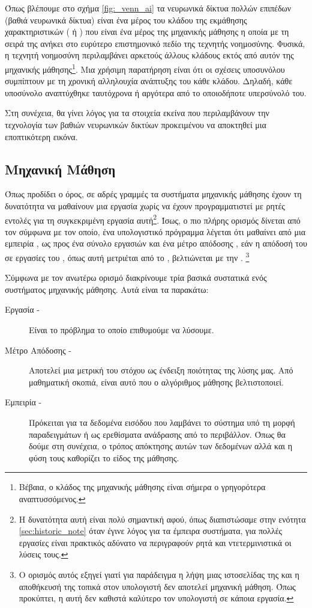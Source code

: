 Όπως βλέπουμε στο σχήμα \ref{fig:_venn_ai} τα νευρωνικά δίκτυα πολλών επιπέδων (βαθιά νευρωνικά δίκτυα) είναι ένα μέρος του κλάδου της εκμάθησης χαρακτηριστικών ( ή ) που είναι ένα μέρος της μηχανικής μάθησης η οποία με τη σειρά της ανήκει στο ευρύτερο επιστημονικό πεδίο της τεχνητής νοημοσύνης. Φυσικά, η τεχνητή νοημοσύνη περιλαμβάνει αρκετούς άλλους κλάδους εκτός από αυτόν της μηχανικής μάθησης\footnote{Βέβαια, ο κλάδος της μηχανικής μάθησης είναι σήμερα ο γρηγορότερα αναπτυσσόμενος.}. Μια χρήσιμη παρατήρηση είναι ότι οι σχέσεις υποσυνόλου συμπίπτουν με τη χρονική αλληλουχία ανάπτυξης του κάθε κλάδου. Δηλαδή, κάθε υποσύνολο αναπτύχθηκε ταυτόχρονα ή αργότερα από το οποιοδήποτε υπερσύνολό του.
\par
Στη συνέχεια, θα γίνει λόγος για τα στοιχεία εκείνα που περιλαμβάνουν την τεχνολογία των βαθιών νευρωνικών δικτύων προκειμένου να αποκτηθεί μια εποπτικότερη εικόνα.

\subsection{Μηχανική Μάθηση}


Όπως προδίδει ο όρος, σε αδρές γραμμές τα συστήματα μηχανικής μάθησης έχουν τη δυνατότητα να μαθαίνουν μια εργασία χωρίς να έχουν προγραμματιστεί με ρητές εντολές για τη συγκεκριμένη εργασία αυτή\footnote{Η δυνατότητα αυτή είναι πολύ σημαντική αφού, όπως διαπιστώσαμε στην ενότητα \ref{sec:historic_note} όταν έγινε λόγος για τα έμπειρα συστήματα, για πολλές εργασίες είναι πρακτικός αδύνατο να περιγραφούν ρητά και ντετερμινιστικά οι λύσεις τους.}. Ίσως, ο πιο πλήρης ορισμός δίνεται από τον  \cite{mitchell1997machine} σύμφωνα με τον οποίο, ένα υπολογιστικό πρόγραμμα λέγεται ότι μαθαίνει από μια εμπειρία , ως προς ένα σύνολο εργασιών  και ένα μέτρο απόδοσης , εάν η απόδοσή του σε εργασίες του , όπως αυτή μετριέται από το , βελτιώνεται με την . \footnote{Ο ορισμός αυτός εξηγεί γιατί για παράδειγμα η λήψη μιας ιστοσελίδας της  και η αποθήκευσή της τοπικά στον υπολογιστή δεν αποτελεί μηχανική μάθηση. Όπως προκύπτει, η  αυτή δεν καθιστά καλύτερο τον υπολογιστή σε κάποια εργασία\cite{geron2019hands}.}
\par

Σύμφωνα με τον ανωτέρω ορισμό διακρίνουμε τρία βασικά συστατικά ενός συστήματος μηχανικής μάθησης. Αυτά είναι τα παρακάτω:
\begin{description}
\item [Εργασία - ] Είναι το πρόβλημα το οποίο επιθυμούμε να λύσουμε.
\item [Μέτρο Απόδοσης - ] Αποτελεί μια μετρική του στόχου ως ένδειξη ποιότητας της λύσης μας. Από μαθηματική σκοπιά, είναι αυτό που ο αλγόριθμος μάθησης βελτιστοποιεί.
\item [Εμπειρία - ] Πρόκειται για τα δεδομένα εισόδου που λαμβάνει το σύστημα υπό τη μορφή παραδειγμάτων ή ως ερεθίσματα ανάδρασης από το περιβάλλον. Όπως θα δούμε στη συνέχεια, ο τρόπος απόκτησης αυτών των δεδομένων αλλά και η φύση τους καθορίζει το είδος της μάθησης.
\end{description}

